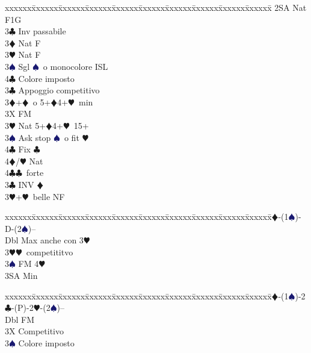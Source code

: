 \documentclass[a4paper,italian]{article}
\newcommand{\BC}{\textcolor{OliveGreen}{$\clubsuit$}}
\newcommand{\BD}{\textcolor{RedOrange}{$\vardiamondsuit$}}
\newcommand{\BH}{\textcolor{Red2}{$\varheartsuit${}}}
\newcommand{\BS}{\textcolor{MidnightBlue}{$\spadesuit${}}}
\newenvironment{bidtable}
{\begin{tabbing}

    xxxxxx\=xxxxxx\=xxxxxx\=xxxxxx\=xxxxxx\=xxxxxx\=xxxxxx\=xxxxxx\=xxxxxx\=xxxxxx\=\kill}
{\end{tabbing} }%
\newenvironment{sviluppi}
{\begin{tcolorbox}[colframe=azzurro,title=Sviluppi particolari]}
    {
\end{tcolorbox} }%
\begin{document}
\begin{multicols*}{2}
\begin{bidtable}
        2SA \> Nat F1G\+\\
        3\BC \> Inv passabile\\
        3\BD \> Nat F\\
        3\BH \> Nat F\\
        3\BS \> Sgl \BS\ o monocolore ISL\\
        4\BC \> Colore imposto\-\\
        3\BC \> Appoggio competitivo\\
        3\BD {}+\BD\ o 5+\BD 4+\BH\ min\+\\
        3X \> FM\-\\
        3\BH \> Nat 5+\BD 4+\BH\ 15+\+\\
        3\BS \> Ask stop \BS\ o fit \BH \\
        4\BC \> Fix \BC \\
        4\BD/\BH \> Nat\-\\
        4\BC {}\BC\ forte\-\\
        3\BC \> INV \BD \\
        3\BH {}+\BH\ belle NF\-
    \end{bidtable}

    \begin{sviluppi}
        \begin{bidtable}
            1\BD-(1\BS)-D-(2\BS)--\+\\
            Dbl \> Max anche con 3\BH \\
            3\BH {}\BH\ competititvo\\
            3\BS \> FM 4\BH \+\\
            3SA \> Min\-\-
        \end{bidtable}
        \bigbreak
        \begin{bidtable}
            1\BD-(1\BS)-2\BC-(P)-2\BH-(2\BS)--\+\\
            Dbl \> FM\\
            3X \> Competitivo\\
            3\BS \> Colore imposto\-
        \end{bidtable}
    \end{sviluppi}
\end{multicols*}
\end{document}
